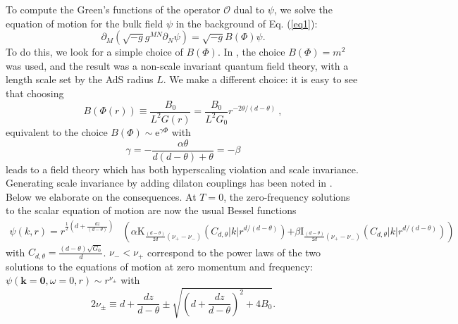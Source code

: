 \documentclass[10pt, oneside]{book}
\begin{document}
\begin{doublespace}
To compute the Green's functions of the operator $\mathcal{O}$ dual to $\psi$, we solve the equation of motion for the bulk field $\psi$ in the background of Eq. (\ref{eq1}): \begin{equation}
\partial_M \left(\sqrt{-g}g^{MN}\partial_N\psi\right) = \sqrt{-g} B(\Phi)\psi.   \label{eqpsi0}
\end{equation}  To do this, we look for a simple choice of $B(\Phi)$.  In \cite{Dong:2012se}, the choice $B(\Phi)=m^2$ was used, and the result was a non-scale invariant quantum field theory, with a length scale set by the AdS radius $L$.    We make a different choice: it is easy to see that choosing \begin{equation}
B(\Phi(r)) \equiv  \frac{B_0}{L^2 G(r)} = \frac{B_0}{L^2 G_0} r^{-2\theta/(d-\theta)}~,
\end{equation}
equivalent to the choice $B(\Phi) \sim \mathrm{e}^{\gamma\Phi}$ with
\begin{equation}
\gamma = -\frac{\alpha \theta }{d(d-\theta) + \theta} =-\beta
\end{equation}
leads to a field theory which has both hyperscaling violation and scale invariance.   Generating scale invariance by adding dilaton couplings has been noted in \cite{Gath:2012pg, Gouteraux:2014hca}.   Below we elaborate on the consequences.   At $T=0$, the zero-frequency %
solutions to the scalar equation of motion are now the usual Bessel functions
\begin{align}
\psi(k,r) = r^{\frac{1}{2}(d+\frac{dz}{(d-\theta)})}&\left(\alpha \mathrm{K}_{\frac{(d-\theta)}{2d}(\nu_+-\nu_-)}\left(C_{d,\theta}|k|r^{d/(d-\theta)}\right) \right.
\left.+
\beta \mathrm{I}_{\frac{(d-\theta)}{2d}(\nu_+-\nu_-)}\left(C_{d,\theta}|k|r^{d/(d-\theta)}\right) \right)
 \label{eq9}
\end{align} 
with $C_{d,\theta}=\frac{(d-\theta)\sqrt{G_0}}{d}$.  $\nu_-<\nu_+$ correspond to the power laws of the two solutions to the equations of motion at zero momentum and frequency: $\psi(\mathbf{k}=\mathbf{0},\omega=0,r) \sim r^{\nu_\pm}$ with \begin{equation}
2\nu_\pm \equiv  d+\frac{dz}{d-\theta} \pm \sqrt{\left(d+\frac{dz}{d-\theta}\right)^2 + 4B_0}.
\end{equation}

\end{doublespace}
\end{document}
